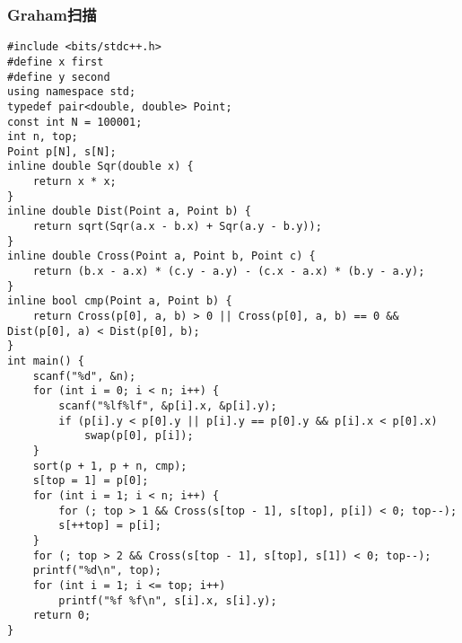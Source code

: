 \documentclass[a4paper]{article}
\begin{document}
\subsubsection{Graham扫描}
\begin{lstlisting}
#include <bits/stdc++.h>
#define x first
#define y second
using namespace std;
typedef pair<double, double> Point;
const int N = 100001;
int n, top;
Point p[N], s[N];
inline double Sqr(double x) {
    return x * x;
}
inline double Dist(Point a, Point b) {
    return sqrt(Sqr(a.x - b.x) + Sqr(a.y - b.y));
}
inline double Cross(Point a, Point b, Point c) {
    return (b.x - a.x) * (c.y - a.y) - (c.x - a.x) * (b.y - a.y);
}
inline bool cmp(Point a, Point b) {
    return Cross(p[0], a, b) > 0 || Cross(p[0], a, b) == 0 && Dist(p[0], a) < Dist(p[0], b);
}
int main() {
    scanf("%d", &n);
    for (int i = 0; i < n; i++) {
        scanf("%lf%lf", &p[i].x, &p[i].y);
        if (p[i].y < p[0].y || p[i].y == p[0].y && p[i].x < p[0].x)
            swap(p[0], p[i]);
    }
    sort(p + 1, p + n, cmp);
    s[top = 1] = p[0];
    for (int i = 1; i < n; i++) {
        for (; top > 1 && Cross(s[top - 1], s[top], p[i]) < 0; top--);
        s[++top] = p[i];
    }
    for (; top > 2 && Cross(s[top - 1], s[top], s[1]) < 0; top--);
    printf("%d\n", top);
    for (int i = 1; i <= top; i++)
        printf("%f %f\n", s[i].x, s[i].y);
    return 0;
}
\end{lstlisting}
\end{document}
